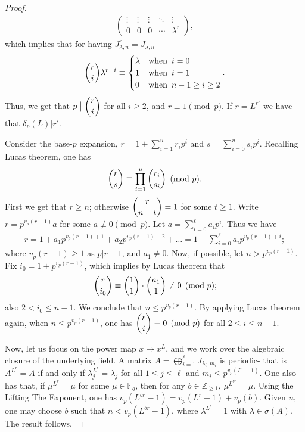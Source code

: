 \documentclass[10pt,a4paper]{amsart}
\newcommand{\F}{\mathbb{F}}
\newcommand{\Z}{\mathbb{Z}}
\begin{document}
\begin{proof}
\begin{align*}
\begin{pmatrix}
\vdots & \vdots & \vdots & \ddots & \vdots \\
0 & 0 & 0 & \cdots & \lambda^r
\end{pmatrix},
\end{align*}
which implies that for having $J_{\lambda,n}^r=J_{\lambda,n}$ 
\begin{align*}
    \displaystyle{\dbinom{r}{i}}\lambda^{r-i}\equiv\begin{cases}
       \lambda&\text{when }\,i=0\\
       1&\text{when }\,i=1\\
       0&\text{when }\, n-1\geq i\geq 2
    \end{cases}.
\end{align*}
Thus, we get that $p\bigm|\dbinom{r}{i}$ for all $i\geq 2$, and $r\equiv 1\pmod{p}$.
If $r=L^{r'}$ we have that $\delta_p(L)|r'$.

Consider the base-$p$ expansion, $r=1+\sum\limits_{i=1}^{u}r_ip^i$ and $s=\sum\limits_{i=0}^{u}s_ip^i$.
Recalling Lucas theorem, one has
\begin{align*}
    \dbinom{r}{s}\equiv\prod\limits_{i=1}^u\dbinom{r_i}{s_i}\pmod{p}.
\end{align*}
First we get that $r\geq n$; otherwise $\dbinom{r}{n-t}=1$ for some $t\geq 1$.
Write $r=p^{v_p(r-1)}a$ for some $a\not\equiv 0 \pmod{p}$.
Let $a=\sum\limits_{i=0}^\ell a_ip^i$.
Thus we have 
\begin{align*}
    r=1+a_1p^{v_p(r-1)+1}+a_2p^{v_p(r-1)+2}+\ldots=1+\sum\limits_{i=0}^{\ell}a_ip^{v_p(r-1)+i};
\end{align*}
where $v_p(r-1)\geq 1$ as $p|r-1$, and $a_1\neq 0$. Now, if possible, let $n>p^{v_p(r-1)}$. Fix $i_0=1+p^{v_p(r-1)}$, which implies by Lucas theorem that
\begin{align*}
    \dbinom{r}{i_0}\equiv\dbinom{1}{1}\cdot\dbinom{a_1}{1}\neq 0\pmod{p};
\end{align*}
also $2<i_0\leq n-1$. 
We conclude that $n\leq p^{v_p(r-1)}$.
By applying Lucas theorem again, when $n\leq p^{v_p(r-1)}$, one has $\dbinom{r}{i}\equiv0\pmod{p}$ for all $2\leq i\leq n-1$.

Now, let us focus on the power map $x\mapsto x^L$, and we work over the algebraic closure of the underlying field.
A matrix $A=\bigoplus\limits_{i=1}^{\ell}J_{\lambda_i,m_i}$ is periodic- that is $A^{L^r}=A$ if and only if $\lambda_j^{L^r}=\lambda_j$ for all $1\leq j\leq \ell$ and $m_i\leq p^{v_p(L^r-1)}$.
One also has that, if $\mu^{L^r}=\mu$ for some $\mu\in\overline{\F_q}$, then for any $b\in\Z_{\geq 1}$, $\mu^{L^{br}}=\mu$. 
Using the Lifting The Exponent, one has $v_p(L^{br}-1)=v_p(L^r-1)+v_p(b)$. 
Given $n$, one may choose $b$ such that $n<v_p(L^{br}-1)$, where $\lambda^{L^r}=1$ with $\lambda\in\sigma(A)$. The result follows.
\end{proof}
\end{document}
